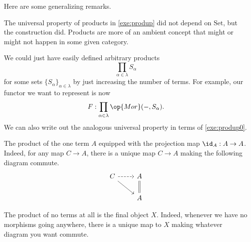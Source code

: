 Here are some generalizing remarks.
\begin{remark}
	The universal property of products in \autoref{exe:produp} did not depend on $\mathrm{Set}$, but the construction did. Products are more of an ambient concept that might or might not happen in some given category.
\end{remark}
\begin{remark}
	We could just have easily defined arbitrary products
	\[\prod_{\alpha\in\lambda}S_\alpha\]
	for some sets $\{S_\alpha\}_{\alpha\in\lambda}$ by just increasing the number of terms. For example, our functor we want to represent is now
	\[F:\prod_{\alpha\in\lambda}\op{Mor}(-,S_\alpha).\]
	We can also write out the analogous universal property in terms of \autoref{exe:produp0}.
\end{remark}
\begin{example}
	The product of the one term $A$ equipped with the projection map $\id_A:A\to A$. Indeed, for any map $C\to A$, there is a unique map $C\to A$ making the following diagram commute.
	\[\begin{tikzcd}
		C & A \\
		& A
		\arrow[Rightarrow, no head, from=1-2, to=2-2]
		\arrow[from=1-1, to=2-2]
		\arrow[dashed, from=1-1, to=1-2]
	\end{tikzcd}\]
\end{example}
\begin{example}
	The product of no terms at all is the final object $X$. Indeed, whenever we have no morphisms going anywhere, there is a unique map to $X$ making whatever diagram you want commute.
\end{example}

